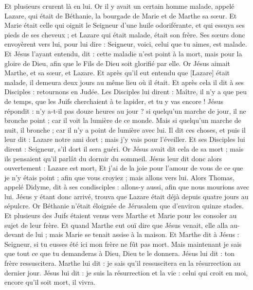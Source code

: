 \begin{multicols}{2}
Et plusieurs crurent là en lui.
\VerseOne{}Or il y avait un certain homme malade, appelé Lazare, qui était de Béthanie, la bourgade de Marie et de Marthe sa sœur.
Et Marie était celle qui oignit le Seigneur d'une huile odoriférante, et qui essuya ses pieds de ses cheveux ; et Lazare qui était malade, était son frère.
Ses sœurs donc envoyèrent vers lui, pour lui dire : Seigneur, voici, celui que tu aimes, est malade.
Et Jésus l'ayant entendu, dit : cette maladie n'est point à la mort, mais pour la gloire de Dieu, afin que le Fils de Dieu soit glorifié par elle.
Or Jésus aimait Marthe, et sa sœur, et Lazare.
Et après qu'il eut entendu que [Lazare] était malade, il demeura deux jours au même lieu où il était.
Et après cela il dit à ses Disciples : retournons en Judée.
Les Disciples lui dirent : Maître, il n'y a que peu de temps, que les Juifs cherchaient à te lapider, et tu y vas encore !
Jésus répondit : n'y a-t-il pas douze heures au jour ? si quelqu'un marche de jour, il ne bronche point ; car il voit la lumière de ce monde.
Mais si quelqu'un marche de nuit, il bronche ; car il n'y a point de lumière avec lui.
Il dit ces choses, et puis il leur dit : Lazare notre ami dort ; mais j'y vais pour l'éveiller.
Et ses Disciples lui dirent : Seigneur, s'il dort il sera guéri.
Or Jésus avait dit cela de sa mort ; mais ils pensaient qu'il parlât du dormir du sommeil.
Jésus leur dit donc alors ouvertement : Lazare est mort,
Et j'ai de la joie pour l'amour de vous de ce que je n'y étais point ; afin que vous croyiez ; mais allons vers lui.
Alors Thomas, appelé Didyme, dit à ses condisciples : allons-y aussi, afin que nous mourions avec lui.
Jésus y étant donc arrivé, trouva que Lazare était déjà depuis quatre jours au sépulcre.
Or Béthanie n'était éloignée de Jérusalem que d'environ quinze stades.
Et plusieurs des Juifs étaient venus vers Marthe et Marie pour les consoler au sujet de leur frère.
Et quand Marthe eut ouï dire que Jésus venait, elle alla au-devant de lui ; mais Marie se tenait assise à la maison.
Et Marthe dit à Jésus : Seigneur, si tu eusses été ici mon frère ne fût pas mort.
Mais maintenant je sais que tout ce que tu demanderas à Dieu, Dieu te le donnera.
Jésus lui dit : ton frère ressuscitera.
Marthe lui dit : je sais qu'il ressuscitera en la résurrection au dernier jour.
Jésus lui dit : je suis la résurrection et la vie : celui qui croit en moi, encore qu'il soit mort, il vivra.

\end{multicols}
